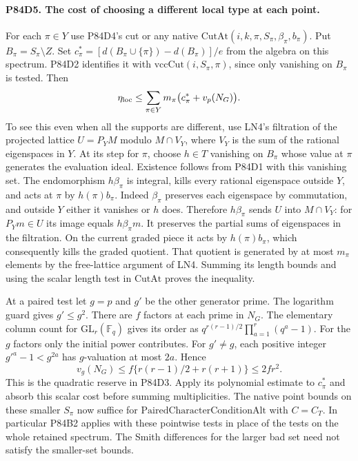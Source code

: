 \paragraph{P84D5. The cost of choosing a different local type at each point.}
For each $\pi\in Y$ use P84D4's cut or any native
$\mathrm{CutAt}(i,k,\pi,S_\pi,\beta_\pi,b_\pi)$. Put
$B_\pi=S_\pi\setminus Z$. Set $c_\pi^*=
[d(B_\pi\cup\{\pi\})-d(B_\pi)]/e$ from the algebra on
this spectrum. P84D2 identifies it with
$\mathrm{vccCut}(i,S_\pi,\pi)$, since only vanishing on
$B_\pi$ is tested. Then
\[
 \eta_{\rm loc}\le\sum_{\pi\in Y}m_\pi
            \bigl(c_\pi^*+v_p(N_G)\bigr).
\]
To see this even when all the supports are different, use LN4's
filtration of the projected lattice $U=P_Y M$ modulo
$M\cap V_Y$, where $V_Y$ is the sum of the rational eigenspaces
in $Y$. At its step for $\pi$, choose $h\in T$ vanishing on
$B_\pi$ whose value at $\pi$ generates the evaluation ideal.
Existence follows from P84D1 with this vanishing set. The
endomorphism $h\beta_\pi$ is integral, kills every rational
eigenspace outside $Y$, and acts at $\pi$ by $h(\pi)b_\pi$.
Indeed $\beta_\pi$ preserves each eigenspace by commutation,
and outside $Y$ either it vanishes or $h$ does. Therefore
$h\beta_\pi$ sends $U$ into $M\cap V_Y$: for $P_Ym\in U$ its
image equals $h\beta_\pi m$. It preserves the partial sums of
eigenspaces in the filtration. On the current graded piece
it acts by $h(\pi)b_\pi$, which consequently kills the
graded quotient. That quotient is generated by at most $m_\pi$
elements by the free-lattice argument of LN4. Summing its
length bounds and using the scalar length test in
$\mathrm{CutAt}$ proves the inequality.

At a paired test let $g=p$ and $g'$ be the other generator
prime. The logarithm guard gives $g'\le g^2$. There are $f$
factors at each prime in $N_G$. The elementary column count for
$\mathrm{GL}_r(\mathbb F_q)$ gives its order as
$q^{r(r-1)/2}\prod_{a=1}^r(q^a-1)$. For the $g$ factors
only the initial power contributes. For $g'\ne g$, each
positive integer $g'^a-1<g^{2a}$ has $g$-valuation at most
$2a$. Hence
\[
 v_g(N_G)\le f\{r(r-1)/2+r(r+1)\}\le 2fr^2.
\]
This is the quadratic reserve in P84D3. Apply its polynomial
estimate to $c_\pi^*$ and absorb this scalar cost before summing
multiplicities. The native point bounds on these smaller
$S_\pi$ now suffice for $\mathrm{PairedCharacterConditionAlt}$
with $C=C_T$. In particular P84B2 applies with these
pointwise tests in place of the tests on the whole retained
spectrum. The Smith differences for the larger bad set need
not satisfy the smaller-set bounds.
